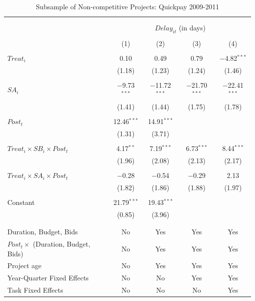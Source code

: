 \documentclass[
]{article}
\begin{document}
\begin{table}[H] \centering 
  \caption{Subsample of Non-competitive Projects: Quickpay 2009-2011} 
  \label{} 
\small 
\begin{tabular}{@{\extracolsep{-2pt}}lcccc} 
\\[-1.8ex]\hline 
\hline \\[-1.8ex] 
\\[-1.8ex] & \multicolumn{4}{c}{$Delay_{it}$ (in days)} \\ 
\\[-1.8ex] & (1) & (2) & (3) & (4)\\ 
\hline \\[-1.8ex] 
 $Treat_i$ & 0.10 & 0.49 & 0.79 & $-$4.82$^{***}$ \\ 
  & (1.18) & (1.23) & (1.24) & (1.46) \\ 
  & & & & \\ 
 $SA_i$ & $-$9.73$^{***}$ & $-$11.72$^{***}$ & $-$21.70$^{***}$ & $-$22.41$^{***}$ \\ 
  & (1.41) & (1.44) & (1.75) & (1.78) \\ 
  & & & & \\ 
 $Post_t$ & 12.46$^{***}$ & 14.91$^{***}$ &  &  \\ 
  & (1.31) & (3.71) &  &  \\ 
  & & & & \\ 
 $Treat_i \times SB_i \times Post_t$ & 4.17$^{**}$ & 7.19$^{***}$ & 6.73$^{***}$ & 8.44$^{***}$ \\ 
  & (1.96) & (2.08) & (2.13) & (2.17) \\ 
  & & & & \\ 
 $Treat_i \times SA_i \times Post_t$ & $-$0.28 & $-$0.54 & $-$0.29 & 2.13 \\ 
  & (1.82) & (1.86) & (1.88) & (1.97) \\ 
  & & & & \\ 
 Constant & 21.79$^{***}$ & 19.43$^{***}$ &  &  \\ 
  & (0.85) & (3.96) &  &  \\ 
  & & & & \\ 
\hline \\[-1.8ex] 
Duration, Budget, Bids & No & Yes & Yes & Yes \\ 
$Post_t \times $  (Duration, Budget, Bids) & No & Yes & Yes & Yes \\ 
Project age & No & Yes & Yes & Yes \\ 
Year-Quarter Fixed Effects & No & No & Yes & Yes \\ 
Task Fixed Effects & No & No & No & Yes \\ 

\end{tabular}
\end{table}
\end{document}
